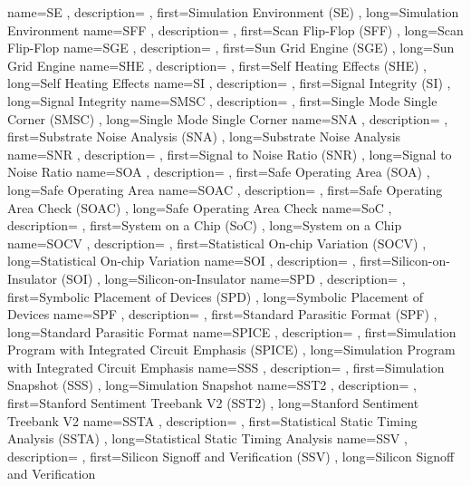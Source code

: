 { name={SE}
, description={}
, first={Simulation Environment (SE)}
, long={Simulation Environment}
}
{ name={SFF}
, description={}
, first={Scan Flip-Flop (SFF)}
, long={Scan Flip-Flop}
}
{ name={SGE}
, description={}
, first={Sun Grid Engine (SGE)}
, long={Sun Grid Engine}
}
{ name={SHE}
, description={}
, first={Self Heating Effects (SHE)}
, long={Self Heating Effects}
}
{ name={SI}
, description={}
, first={Signal Integrity (SI)}
, long={Signal Integrity}
}
{ name={SMSC}
, description={}
, first={Single Mode Single Corner (SMSC)}
, long={Single Mode Single Corner}
}
{ name={SNA}
, description={}
, first={Substrate Noise Analysis (SNA)}
, long={Substrate Noise Analysis}
}
{ name={SNR}
, description={}
, first={Signal to Noise Ratio (SNR)}
, long={Signal to Noise Ratio}
}
{ name={SOA}
, description={}
, first={Safe Operating Area (SOA)}
, long={Safe Operating Area}
}
{ name={SOAC}
, description={}
, first={Safe Operating Area Check (SOAC)}
, long={Safe Operating Area Check}
}
{ name={SoC}
, description={}
, first={System on a Chip (SoC)}
, long={System on a Chip}
}
{ name={SOCV}
, description={}
, first={Statistical On-chip Variation (SOCV)}
, long={Statistical On-chip Variation}
}
{ name={SOI}
, description={}
, first={Silicon-on-Insulator (SOI)}
, long={Silicon-on-Insulator}
}
{ name={SPD}
, description={}
, first={Symbolic Placement of Devices (SPD)}
, long={Symbolic Placement of Devices}
}
{ name={SPF}
, description={}
, first={Standard Parasitic Format (SPF)}
, long={Standard Parasitic Format}
}
{ name={SPICE}
, description={}
, first={Simulation Program with Integrated Circuit Emphasis (SPICE)}
, long={Simulation Program with Integrated Circuit Emphasis}
}
{ name={SSS}
, description={}
, first={Simulation Snapshot (SSS)}
, long={Simulation Snapshot}
}
{ name={SST2}
, description={}
, first={Stanford Sentiment Treebank V2 (SST2)}
, long={Stanford Sentiment Treebank V2}
}
{ name={SSTA}
, description={}
, first={Statistical Static Timing Analysis (SSTA)}
, long={Statistical Static Timing Analysis}
}
{ name={SSV}
, description={}
, first={Silicon Signoff and Verification (SSV)}
, long={Silicon Signoff and Verification}
}
